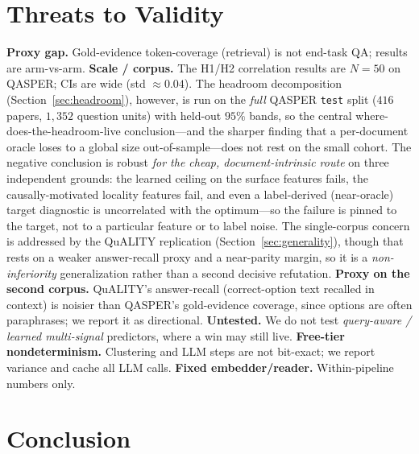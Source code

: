 \documentclass[11pt]{article}
\begin{document}
\section{Threats to Validity}
\label{sec:threats}

\textbf{Proxy gap.} Gold-evidence token-coverage (retrieval) is not end-task QA;
results are arm-vs-arm. \textbf{Scale / corpus.} The H1/H2 correlation results are $N{=}50$ on QASPER; CIs
are wide (std $\approx 0.04$). The headroom decomposition
(Section~\ref{sec:headroom}), however, is run on the \emph{full} QASPER
\texttt{test} split ($416$ papers, $1{,}352$ question units) with held-out $95\%$
bands, so the central where-does-the-headroom-live conclusion---and the sharper
finding that a per-document oracle loses to a global size out-of-sample---does not
rest on the small cohort. The negative conclusion is robust \emph{for the cheap,
document-intrinsic route} on three independent grounds: the learned ceiling on the
surface features fails, the causally-motivated locality features fail, and even a
label-derived (near-oracle) target diagnostic is uncorrelated with the optimum---so
the failure is pinned to the target, not to a particular feature or to label
noise. The single-corpus concern is addressed by the QuALITY replication
(Section~\ref{sec:generality}), though that rests on a weaker answer-recall proxy
and a near-parity margin, so it is a \emph{non-inferiority} generalization rather
than a second decisive refutation. \textbf{Proxy on the second corpus.} QuALITY's
answer-recall (correct-option text recalled in context) is noisier than QASPER's
gold-evidence coverage, since options are often paraphrases; we report it as
directional. \textbf{Untested.} We do not test \emph{query-aware / learned
multi-signal} predictors, where a win may still live. \textbf{Free-tier nondeterminism.} Clustering and LLM steps are not
bit-exact; we report variance and cache all LLM calls. \textbf{Fixed
embedder/reader.} Within-pipeline numbers only.

\section{Conclusion}
\label{sec:conclusion}
\end{document}
